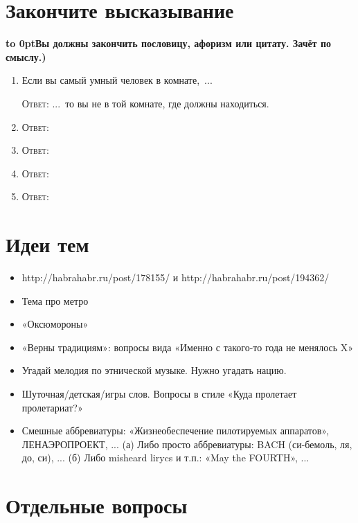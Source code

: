\documentclass[a4paper,10pt]{article}
\let\keyword\textsc
\newenvironment{topic}{\begin{enumerate}}{\end{enumerate}}
\newcommand{\question}[3]{\item[#1.] #2 \par \keyword{Ответ:} #3}
\newcommand{\topiccommentary}[1]{\begin{adjustwidth}{0.9cm}{} \vspace{-0.3em}\textbf{\hbox to 0pt{\hss{(}}#1)} \end{adjustwidth}}
\begin{document}
\section{Закончите высказывание}
\topiccommentary{Вы должны закончить пословицу, афоризм или цитату. Зачёт по смыслу.}

\begin{topic}
 \question{??}{Если вы самый умный человек в комнате,~...}{...~то вы не в той комнате, где должны находиться.}
 \question{??}{}{}
 \question{??}{}{}
 \question{??}{}{}
 \question{??}{}{}
\end{topic}


\newpage
\section{Идеи тем}

\begin{itemize}
 \item http://habrahabr.ru/post/178155/ и http://habrahabr.ru/post/194362/
 \item Тема про метро
 \item «Оксюмороны»
 \item «Верны традициям»: вопросы вида «Именно с такого-то года не менялось X»
 \item Угадай мелодия по этнической музыке. Нужно угадать нацию.
 \item Шуточная/детская/игры слов. Вопросы в стиле «Куда пролетает пролетариат?»
 \item Смешные аббревиатуры: «Жизнеобеспечение пилотируемых аппаратов», ЛЕНАЭРОПРОЕКТ, ...
       (а) Либо просто аббревиатуры: BACH (си-бемоль, ля, до, си), ...
       (б) Либо misheard lirycs и т.п.: «May the FOURTH», ...
\end{itemize}


\section{Отдельные вопросы}
\end{document}
